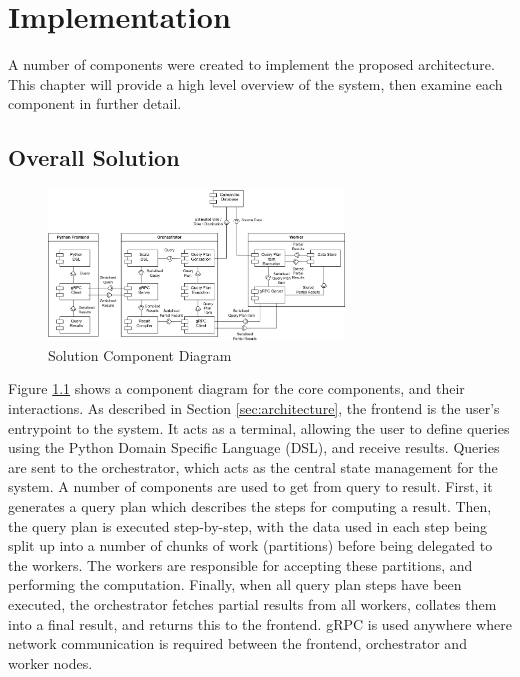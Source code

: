 \chapter{Implementation}

A number of components were created to implement the proposed architecture. This chapter will provide a high level overview of the system, then examine each component in further detail.

\section{Overall Solution}
\begin{figure}[h]
	\centering
	\includegraphics[width=0.7\textwidth]{chapters/diagrams/implementation/component-architecture-diagram}
	\caption{Solution Component Diagram}
	\label{fig:component-architecture-diagram}
\end{figure}

Figure \ref{fig:component-architecture-diagram} shows a component diagram for the core components, and their interactions. As described in Section \ref{sec:architecture}, the frontend is the user's entrypoint to the system. It acts as a terminal, allowing the user to define queries using the Python Domain Specific Language (DSL), and receive results. Queries are sent to the orchestrator, which acts as the central state management for the system. A number of components are used to get from query to result. First, it generates a query plan which describes the steps for computing a result. Then, the query plan is executed step-by-step, with the data used in each step being split up into a number of chunks of work (partitions) before being delegated to the workers. The workers are responsible for accepting these partitions, and performing the computation. Finally, when all query plan steps have been executed, the orchestrator fetches partial results from all workers, collates them into a final result, and returns this to the frontend. gRPC is used anywhere where network communication is required between the frontend, orchestrator and worker nodes.

